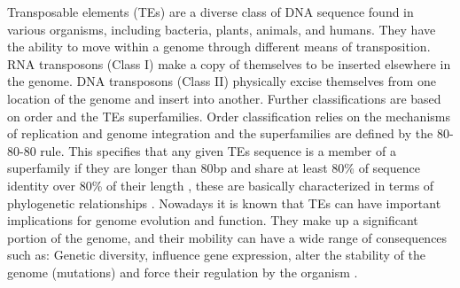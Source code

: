 \documentclass[unnumsec,webpdf,contemporary,large]{oup-authoring-template}%
\theoremstyle{thmstyleone}%
\theoremstyle{thmstyletwo}%
\theoremstyle{thmstylethree}%
\begin{document}
Transposable elements (TEs) are a diverse class of DNA sequence found in various organisms, including bacteria, plants, animals, and humans. They have the ability to move within a genome through different means of transposition. RNA transposons (Class I) make a copy of themselves to be inserted elsewhere in the genome. DNA transposons (Class II) physically excise themselves from one location of the genome and insert into another. Further classifications are based on order and the TEs superfamilies. Order classification relies on the mechanisms of replication and genome integration and the superfamilies are defined by the 80-80-80 rule. This specifies that any given TEs sequence is a member of a superfamily if they are longer than 80bp and share at least 80\% of sequence identity over 80\% of their length \cite{wicker_unified_2007}, these are basically characterized in terms of phylogenetic relationships \cite{feschotte_dna_2007}. Nowadays it is known that TEs can have important implications for genome evolution and function.
They make up a significant portion of the genome, and their mobility can have a wide range of consequences such as: Genetic diversity, influence gene expression, alter the stability of the genome (mutations) and force their regulation by the organism \cite{bourque_ten_2018, arkhipova_giant_2019, pontis_primate-specific_2022}. 
\end{document}
